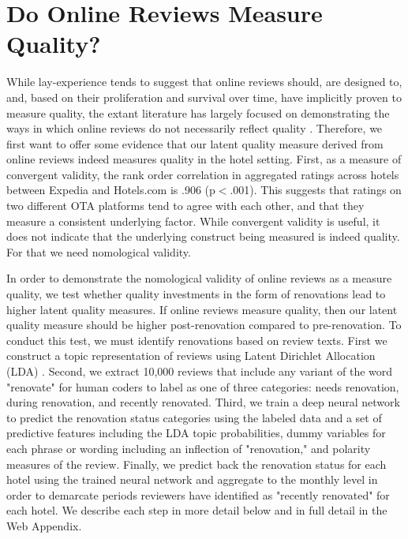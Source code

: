 \documentclass[mksc,blindrev]{informs3} %
\begin{document}
\section{Do Online Reviews Measure Quality?} \label{sec:quality}
While lay-experience tends to suggest that online reviews should, are designed to, and, based on their proliferation and survival over time, have implicitly proven to measure quality, the extant literature has largely focused on demonstrating the ways in which online reviews do not necessarily reflect quality \citep{mcauley2013amateurs, moe2012online, mayzlin2014promotional}. Therefore, we first want to offer some evidence that our latent quality measure derived from online reviews indeed measures quality in the hotel setting. First, as a measure of convergent validity, the rank order correlation in aggregated ratings across hotels between Expedia and Hotels.com is .906 (p$<$.001). This suggests that ratings on two different OTA platforms tend to agree with each other, and that they measure a consistent underlying factor. While convergent validity is useful, it does not indicate that the underlying construct being measured is indeed quality. For that we need nomological validity.

In order to demonstrate the nomological validity of online reviews as a measure quality, we test whether quality investments in the form of renovations lead to higher latent quality measures. If online reviews measure quality, then our latent quality measure should be higher post-renovation compared to pre-renovation. To conduct this test, we must identify renovations based on review texts. First we construct a topic representation of reviews using Latent Dirichlet Allocation (LDA) \citep{blei2003latent, wang2018and}. Second, we extract 10,000 reviews that include any variant of the word "renovate" for human coders to label as one of three categories: needs renovation, during renovation, and recently renovated. Third, we train a deep neural network to predict the renovation status categories using the labeled data and a set of predictive features including the LDA topic probabilities, dummy variables for each phrase or wording including an inflection of "renovation," and polarity measures of the review. Finally, we predict back the renovation status for each hotel using the trained neural network and aggregate to the monthly level in order to demarcate periods reviewers have identified as "recently renovated" for each hotel. We describe each step in more detail below and in full detail in the Web Appendix. %
\end{document}
